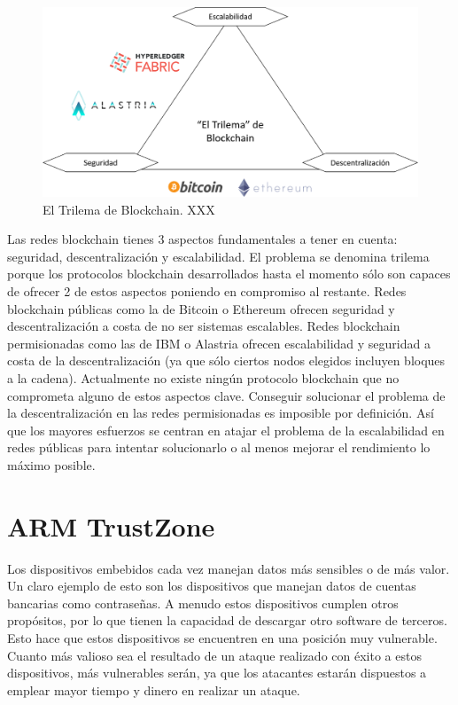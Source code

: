 \begin{figure}
	\centering
	\includegraphics[width=1\textwidth]{imagenes/trilemma2.PNG}
	\caption{\label{fig1}El Trilema de Blockchain. XXX}
\end{figure}

Las redes blockchain tienes 3 aspectos fundamentales a tener en cuenta: seguridad, descentralización y escalabilidad. El problema se denomina trilema porque los protocolos blockchain desarrollados hasta el momento sólo son capaces de ofrecer 2 de estos aspectos poniendo en compromiso al restante. Redes blockchain públicas como la de Bitcoin o Ethereum ofrecen seguridad y descentralización a costa de no ser sistemas escalables. Redes blockchain permisionadas como las de IBM o Alastria ofrecen escalabilidad y seguridad a costa de la descentralización (ya que sólo ciertos nodos elegidos incluyen bloques a la cadena).
Actualmente no existe ningún protocolo blockchain que no comprometa alguno de estos aspectos clave. Conseguir solucionar el problema de la descentralización en las redes permisionadas es imposible por definición. Así que los mayores esfuerzos se centran en atajar el problema de la escalabilidad en redes públicas para intentar solucionarlo o al menos mejorar el rendimiento lo máximo posible.



\section{ARM TrustZone}

Los dispositivos embebidos cada vez manejan datos más sensibles o de más valor. Un claro ejemplo de esto son los dispositivos que manejan datos de cuentas bancarias como contraseñas. A menudo estos dispositivos cumplen otros propósitos, por lo que tienen la capacidad de descargar otro software de terceros. Esto hace que estos dispositivos se encuentren en una posición muy vulnerable. Cuanto más valioso sea el resultado de un ataque realizado con éxito a estos dispositivos, más vulnerables serán, ya que los atacantes estarán dispuestos a emplear mayor tiempo y dinero en realizar un ataque. \newline

